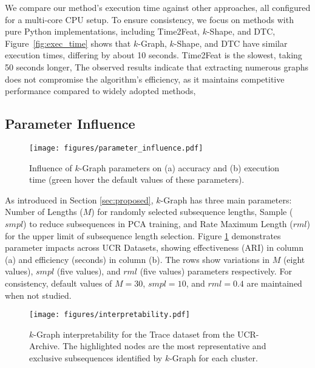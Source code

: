  We compare our method's execution time against other approaches, all configured for a multi-core CPU setup. To ensure consistency, we focus on methods with pure Python implementations, including Time2Feat, $k$-Shape, and DTC,  Figure~\ref{fig:exec_time} shows that $k$-Graph, $k$-Shape, and DTC have similar execution times, differing by about 10 seconds. Time2Feat is the slowest, taking 50 seconds longer, 
 The observed results indicate that extracting numerous graphs does not compromise the algorithm's efficiency, as it maintains competitive performance compared to widely adopted methods, 






\subsection{Parameter Influence}

\begin{figure}[tb]
 \centering
\texttt{[image: figures/parameter\_influence.pdf]}

 \caption{Influence of $k$-Graph parameters on (a) accuracy and (b) execution time (green hover the default values of these parameters).}
 \label{fig:param_infl}
\vspace{-0.3cm}
\end{figure}

 As introduced in Section \ref{sec:proposed}, $k$-Graph has three main parameters: Number of Lengths ($M$) for randomly selected subsequence lengths, Sample ($smpl$) to reduce subsequences in PCA training, and Rate Maximum Length ($rml$) for the upper limit of subsequence length selection. Figure \ref{fig:param_infl} demonstrates parameter impacts across UCR Datasets, showing effectiveness (ARI) in column (a) and efficiency (seconds) in column (b). The rows show variations in $M$ (eight values), $smpl$ (five values), and $rml$ (five values) parameters respectively. For consistency, default values of $M=30$, $smpl=10$, and $rml=0.4$ are maintained when not studied.

\begin{figure}[tb]
 \centering
\texttt{[image: figures/interpretability.pdf]}

 \caption{$k$-Graph interpretability for the Trace dataset from the UCR-Archive. The highlighted nodes are the most representative and exclusive subsequences identified by $k$-Graph for each cluster.}
\label{fig:interpretability}
\vspace{-0.3cm}
\end{figure}

